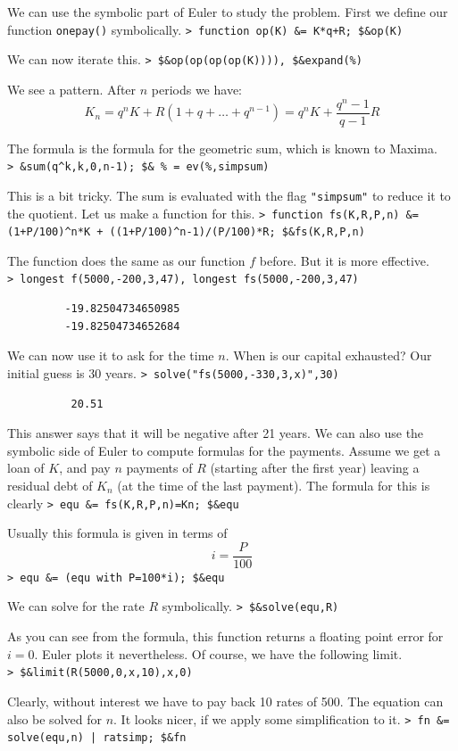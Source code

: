 \documentclass[11pt, a4paper]{article}
\newcommand{\emtcmd}[1]{\noindent\texttt{\textcolor{emtcommand}{>}\ #1}\par\smallskip}
\begin{document}
We can use the symbolic part of Euler to study the problem. First we define our function \texttt{onepay()} symbolically.
\emtcmd{function op(K) \&= K*q+R; \$\&op(K)}

We can now iterate this.
\emtcmd{\$\&op(op(op(op(K)))), \$\&expand(\%)}

We see a pattern. After $n$ periods we have:
$$K_n = q^n K + R (1+q+\ldots+q^{n-1}) = q^n K + \frac{q^n-1}{q-1} R$$

The formula is the formula for the geometric sum, which is known to Maxima.
\emtcmd{\&sum(q\^{}k,k,0,n-1); \$\& \% = ev(\%,simpsum)}

This is a bit tricky. The sum is evaluated with the flag \texttt{"simpsum"} to reduce it to the quotient. Let us make a function for this.
\emtcmd{function fs(K,R,P,n) \&= (1+P/100)\^{}n*K + ((1+P/100)\^{}n-1)/(P/100)*R; \$\&fs(K,R,P,n)}

The function does the same as our function $f$ before. But it is more effective.
\emtcmd{longest f(5000,-200,3,47), longest fs(5000,-200,3,47)}
\begin{verbatim}
         -19.82504734650985
         -19.82504734652684
\end{verbatim}

We can now use it to ask for the time $n$. When is our capital exhausted? Our initial guess is 30 years.
\emtcmd{solve("fs(5000,-330,3,x)",30)}
\begin{verbatim}
          20.51
\end{verbatim}

This answer says that it will be negative after 21 years. We can also use the symbolic side of Euler to compute formulas for the payments. Assume we get a loan of $K$, and pay $n$ payments of $R$ (starting after the first year) leaving a residual debt of $K_n$ (at the time of the last payment). The formula for this is clearly
\emtcmd{equ \&= fs(K,R,P,n)=Kn; \$\&equ}

Usually this formula is given in terms of
$$i = \frac{P}{100}$$
\emtcmd{equ \&= (equ with P=100*i); \$\&equ}

We can solve for the rate $R$ symbolically.
\emtcmd{\$\&solve(equ,R)}

As you can see from the formula, this function returns a floating point error for $i=0$. Euler plots it nevertheless. Of course, we have the following limit.
\emtcmd{\$\&limit(R(5000,0,x,10),x,0)}

Clearly, without interest we have to pay back 10 rates of 500. The equation can also be solved for $n$. It looks nicer, if we apply some simplification to it.
\emtcmd{fn \&= solve(equ,n) | ratsimp; \$\&fn}
\end{document}
